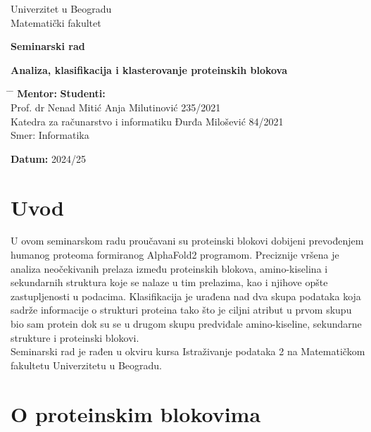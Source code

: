\documentclass[a4paper,12pt]{article}
\begin{document}
\begin{titlepage}
    \centering
    \vspace*{0.2cm}

    { Univerzitet u Beogradu \\ Matematički fakultet\par}

    \vfill

    {\Large \textbf{Seminarski rad}\par}

    \vspace{1cm}

    {\Large \textbf{Analiza, klasifikacija i klasterovanje proteinskih blokova}\par}

    \vfill

    
	
	
	\begin{tabbing}
	\hspace{10cm} \= \hspace{10cm} \= \kill
	\textbf{Mentor:} \>  \textbf{Studenti:} \\
	Prof. dr Nenad Mitić \> Anja Milutinović 235/2021 \\
	Katedra za računarstvo i informatiku \> Đurđa Milošević 84/2021 \\
	\> Smer: Informatika
	\end{tabbing}

    \vfill

    \textbf{Datum:} 2024/25

\end{titlepage}
\newpage
\tableofcontents
\newpage
\section{Uvod}
U ovom seminarskom radu proučavani su proteinski blokovi dobijeni prevođenjem humanog proteoma formiranog AlphaFold2 programom. Preciznije vršena je analiza neočekivanih prelaza između proteinskih blokova, amino-kiselina i sekundarnih struktura koje se nalaze u tim prelazima, kao i njihove opšte zastupljenosti u podacima. Klasifikacija je urađena nad dva skupa podataka koja sadrže informacije o strukturi proteina tako što je ciljni atribut u prvom skupu bio sam protein dok su se u drugom skupu predviđale amino-kiseline, sekundarne strukture i proteinski blokovi. \\
Seminarski rad je rađen u okviru kursa Istraživanje podataka 2 na Matematičkom fakultetu Univerzitetu u Beogradu.
\newpage
\section{O proteinskim blokovima}
\newpage
\end{document}
